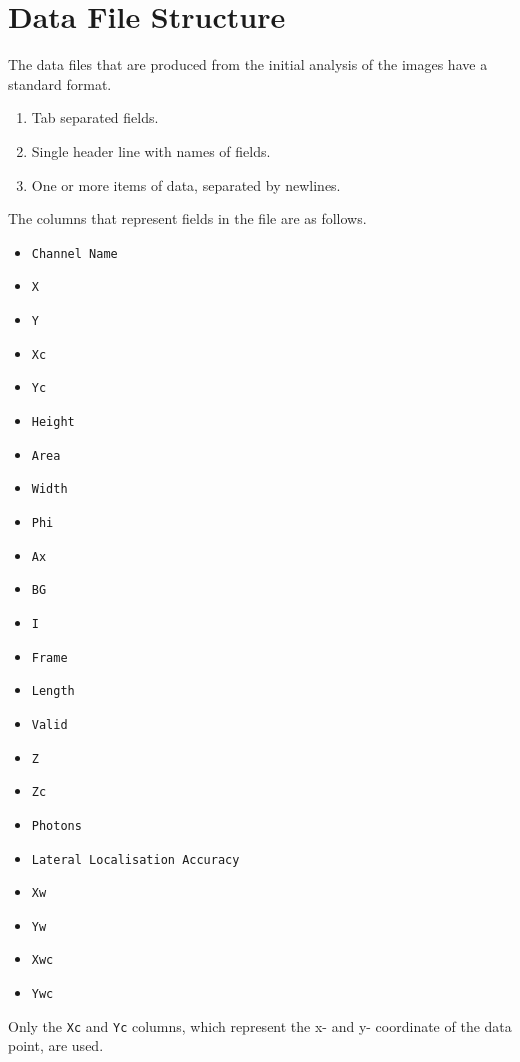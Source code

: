 
\section{Data File Structure}
\label{app:data_file_structure}

The data files that are produced from the initial analysis of the images have a
standard format.

\begin{enumerate}
	\item Tab separated fields.
	\item Single header line with names of fields.
	\item One or more items of data, separated by newlines.
\end{enumerate}

The columns that represent fields in the file are as follows.

\begin{itemize}
		\item \texttt{Channel Name}
		\item \texttt{X}
		\item \texttt{Y}
		\item \texttt{Xc}
		\item \texttt{Yc}
		\item \texttt{Height}
		\item \texttt{Area}
		\item \texttt{Width}
		\item \texttt{Phi}
		\item \texttt{Ax}
		\item \texttt{BG}
		\item \texttt{I}
		\item \texttt{Frame}
		\item \texttt{Length}
		\item \texttt{Valid}
		\item \texttt{Z}
		\item \texttt{Zc}
		\item \texttt{Photons}
		\item \texttt{Lateral Localisation Accuracy}
		\item \texttt{Xw}
		\item \texttt{Yw}
		\item \texttt{Xwc}
		\item \texttt{Ywc}
\end{itemize}

Only the \texttt{Xc} and \texttt{Yc} columns, which represent the x- and y-
coordinate of the data point, are used.
